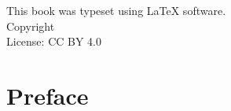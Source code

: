 \documentclass[11pt, a4paper]{book}
\makeatletter
\newcommand{\booklicense}{CC BY 4.0}
\newcommand{\bookauthor}{\@author}
\newcommand{\fakeparagraph}{The theory of relativity is intimately connected
with the theory of space and time. I shall therefore begin with a brief
investigation of the origin of our ideas of space and time, although in
doing so I know that I introduce a controversial subject. The object of all
science, whether natural science or psychology, is to co-ordinate our
experiences and to bring them into a logical system. How are our customary
ideas of space and time related to the character of our experiences?}
\newcommand{\fakecontent}{
\fakeparagraph{}
\fakeparagraph{}

\fakeparagraph{}}
\makeatother
\begin{document}
\begin{flushleft}
\vspace*{\fill}
This book was typeset using \LaTeX{} software.\\
\vspace{\fill}
Copyright \textcopyright{} \the\year{}  \bookauthor\\
License: \booklicense
\end{flushleft}

\addtocounter{page}{2}

\chapter*{Preface}




\setcounter{tocdepth}{3}
\tableofcontents

\mainmatter




\end{document}
